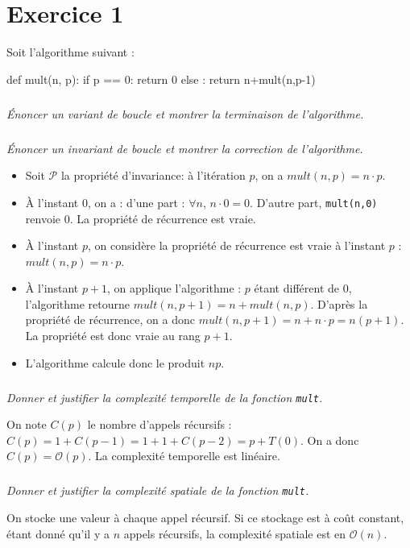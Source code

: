 \section*{Exercice 1}
\setcounter{subparagraph}{0}

Soit l'algorithme suivant : 

\begin{py}
\begin{python}
def mult(n, p):
    if p == 0:
        return 0
    else :
        return n+mult(n,p-1)
\end{python}
\end{py}

\subparagraph{}
\textit{Énoncer un variant de boucle et montrer la terminaison de l'algorithme.}

\subparagraph{}
\textit{Énoncer un invariant de boucle et montrer la correction de l'algorithme.}
\ifprof
\begin{corrige}
\begin{itemize}
\item Soit $\mathcal{P}$ la propriété d'invariance: à l'itération $p$, on a $mult(n,p)=n\cdot p$. 
\item À l'instant 0, on a : d'une part : $\forall n$, $n\cdot 0 = 0$. D'autre part, \texttt{mult(n,0)} renvoie 0. La propriété de récurrence est vraie. 
\item À l'instant $p$, on considère la propriété de récurrence est vraie à l'instant $p$ : $mult(n,p)=n\cdot p$.
\item À l'instant $p+1$, on applique l'algorithme : $p$ étant différent de 0, l'algorithme retourne $mult(n,p+1)=n+mult(n,p)$. D'après la propriété de récurrence, on a donc $mult(n,p+1)=n+ n\cdot p =n(p+1) $. La propriété est donc vraie au rang $p+1$.
\item L'algorithme calcule donc le produit $np$.
\end{itemize}
\end{corrige}
\else
\fi

\subparagraph{}
\textit{Donner et justifier la complexité temporelle de la fonction \texttt{mult}.}
\ifprof
\begin{corrige}
On note $C(p)$ le nombre d'appels récursifs : $C(p) = 1+C(p-1) = 1+1+C(p-2)=p+T(0)$. On a donc $C(p)=\mathcal{O}(p)$. La complexité temporelle est linéaire.
\end{corrige}
\else
\fi

\subparagraph{}
\textit{Donner et justifier la complexité spatiale de la fonction \texttt{mult}.}
\ifprof
\begin{corrige}
On stocke une valeur à chaque appel récursif. Si ce stockage est à coût constant, étant donné qu'il y a $n$ appels récursifs, la complexité spatiale est en $\mathcal{O}(n)$.
\end{corrige}
\else
\fi

